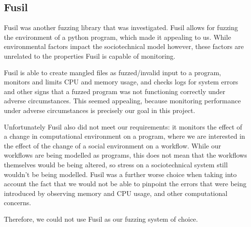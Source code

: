 \subsection{Fusil}
\label{fuzzing_fuzil}
Fusil was another fuzzing library that was investigated. Fusil allows for fuzzing the environment of a python program, which made it appealing to us. While environmental factors impact the sociotechnical model however, these factors are unrelated to the properties Fusil is capable of monitoring. \par
Fusil is able to create mangled files as fuzzed/invalid input to a program, monitors and limits CPU and memory usage, and checks logs for system errors and other signs that a fuzzed program was not functioning correctly under adverse circumstances. This seemed appealing, because monitoring performance under adverse circumstances is precisely our goal in this project. \par
Unfortunately Fusil also did not meet our requirements: it monitors the effect of a change in computational environment on a program, where we are interested in the effect of the change of a social environment on a workflow. While our workflows are being modelled as programs, this does not mean that the workflows themselves would be being altered, so stress on a sociotechnical system still wouldn't be being modelled. Fusil was a further worse choice when taking into account the fact that we would not be able to pinpoint the errors that were being introduced by observing memory and CPU usage, and other computational concerns. \par
Therefore, we could not use Fusil as our fuzzing system of choice. \par

